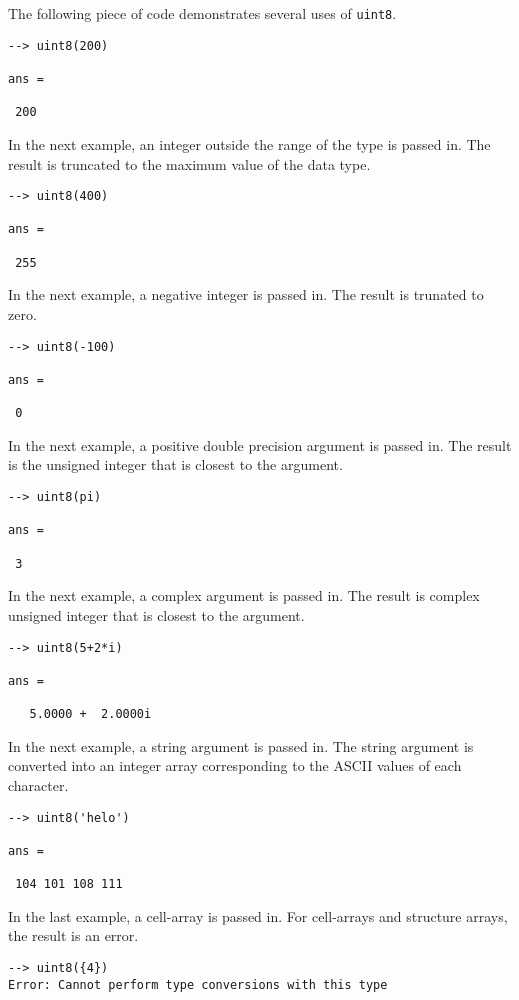 The following piece of code demonstrates several uses of \verb|uint8|.
\begin{verbatim}
--> uint8(200)

ans = 

 200 
\end{verbatim}
In the next example, an integer outside the range  of the type is passed in.  
The result is truncated to the maximum value of the data type.
\begin{verbatim}
--> uint8(400)

ans = 

 255 
\end{verbatim}
In the next example, a negative integer is passed in.  The result is 
trunated to zero.
\begin{verbatim}
--> uint8(-100)

ans = 

 0 
\end{verbatim}
In the next example, a positive double precision argument is passed in.  
The result is the unsigned integer that is closest to the argument.
\begin{verbatim}
--> uint8(pi)

ans = 

 3 
\end{verbatim}
In the next example, a complex argument is passed in.  The result is 
complex unsigned integer that is closest to the argument.
\begin{verbatim}
--> uint8(5+2*i)

ans = 

   5.0000 +  2.0000i 
\end{verbatim}
In the next example, a string argument is passed in.  The string argument 
is converted into an integer array corresponding to the ASCII values of each character.
\begin{verbatim}
--> uint8('helo')

ans = 

 104 101 108 111 
\end{verbatim}
In the last example, a cell-array is passed in.  For cell-arrays and 
structure arrays, the result is an error.
\begin{verbatim}
--> uint8({4})
Error: Cannot perform type conversions with this type
\end{verbatim}
